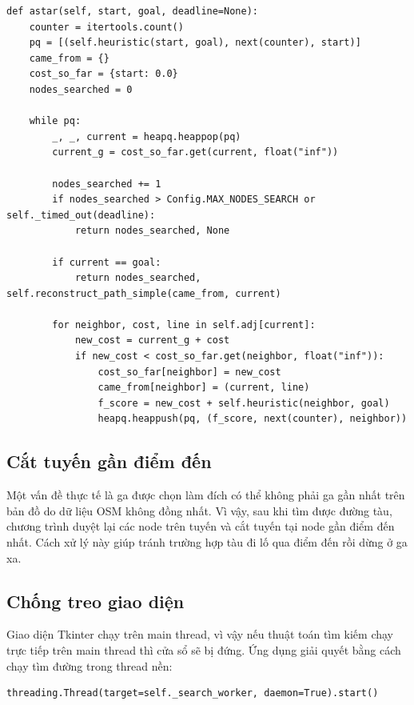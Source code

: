 \documentclass[12pt,a4paper]{article}
\begin{document}
\begin{lstlisting}[style=pythonstyle, caption={Phần cốt lõi của thuật toán A*}]
def astar(self, start, goal, deadline=None):
    counter = itertools.count()
    pq = [(self.heuristic(start, goal), next(counter), start)]
    came_from = {}
    cost_so_far = {start: 0.0}
    nodes_searched = 0

    while pq:
        _, _, current = heapq.heappop(pq)
        current_g = cost_so_far.get(current, float("inf"))

        nodes_searched += 1
        if nodes_searched > Config.MAX_NODES_SEARCH or self._timed_out(deadline):
            return nodes_searched, None

        if current == goal:
            return nodes_searched, self.reconstruct_path_simple(came_from, current)

        for neighbor, cost, line in self.adj[current]:
            new_cost = current_g + cost
            if new_cost < cost_so_far.get(neighbor, float("inf")):
                cost_so_far[neighbor] = new_cost
                came_from[neighbor] = (current, line)
                f_score = new_cost + self.heuristic(neighbor, goal)
                heapq.heappush(pq, (f_score, next(counter), neighbor))
\end{lstlisting}

\subsection{Cắt tuyến gần điểm đến}

Một vấn đề thực tế là ga được chọn làm đích có thể không phải ga gần nhất trên bản đồ do dữ liệu OSM không đồng nhất. Vì vậy, sau khi tìm được đường tàu, chương trình duyệt lại các node trên tuyến và cắt tuyến tại node gần điểm đến nhất. Cách xử lý này giúp tránh trường hợp tàu đi lố qua điểm đến rồi dừng ở ga xa.

\subsection{Chống treo giao diện}

Giao diện Tkinter chạy trên main thread, vì vậy nếu thuật toán tìm kiếm chạy trực tiếp trên main thread thì cửa sổ sẽ bị đứng. Ứng dụng giải quyết bằng cách chạy tìm đường trong thread nền:

\begin{lstlisting}[style=pythonstyle]
threading.Thread(target=self._search_worker, daemon=True).start()
\end{lstlisting}
\end{document}
